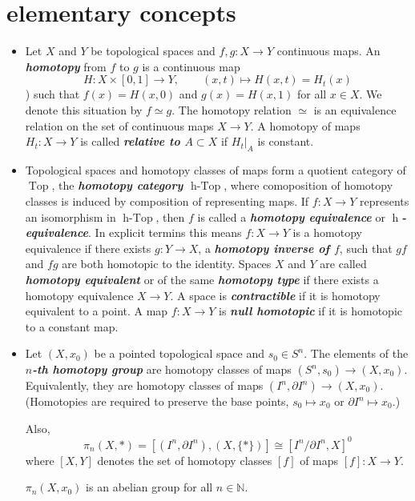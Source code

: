 \documentclass{article}
\newcommand{\N}{\mathbb{N}}
\DeclareMathOperator{\hTop}{h-Top}
\DeclareMathOperator{\Top}{Top}
\begin{document}
\section{elementary concepts}
\begin{defn}\leavevmode
	\begin{itemize}
		\item Let $X$ and $Y$ be topological spaces and $f,g:X\to Y$ continuous maps. An \textbf{\textit{homotopy}} from $f$ to $g$ is a continuous map
		\[H:X\times[0,1]\to Y,\qquad(x,t)\mapsto H(x,t)=H_t(x)\])
		such that $f(x)=H(x,0)$ and $g(x)=H(x,1)$ for all $x\in X$. We denote this situation by $f\simeq g$. The homotopy relation $\simeq$ is an equivalence relation on the set of continuous maps $X\to Y$. A homotopy of maps $H_t:X\to Y$ is called \textbf{\textit{relative to $A\subset X$}} if $H_t|_A$ is constant.
		
		\item Topological spaces and homotopy classes of maps form a quotient category of $\Top$, the \textbf{\textit{homotopy category $\hTop$}}, where comoposition of homotopy classes is induced by composition of representing maps. If $f:X\to Y$ represents an isomorphism in $\hTop$, then $f$ is called a \textbf{\textit{homotopy equivalence}} or \textbf{\textit{$\operatorname{h}$-equivalence}}. In explicit termins this means $f:X\to Y$ is a homotopy equivalence if there exists $g:Y\to X$, a \textbf{\textit{homotopy inverse of $f$}}, such that $gf$ and $fg$ are both homotopic to the identity. Spaces $X$ and $Y$ are called \textbf{\textit{homotopy equivalent}} or of the same \textbf{\textit{homotopy type}} if there exists a homotopy equivalence $X\to Y$. A space is \textbf{\textit{contractible}} if it is homotopy equivalent to a point. A map $f:X\to Y$ is \textbf{\textit{null homotopic}} if it is homotopic to a constant map.
		
		\item Let $(X,x_0)$ be a pointed topological space and $s_0\in S^n$. The elements of the \textbf{\textit{$n$-th homotopy group}} are homotopy classes of maps $(S^n,s_0)\to (X,x_0)$. Equivalently, they are homotopy classes of maps $(I^n,\partial I^n)\to (X,x_0)$. (Homotopies are required to preserve the base points, $s_0\mapsto x_0$ or $\partial I^n\mapsto x_0$.)
		
		Also,
		\[\pi_n(X,*)=[(I^n,\partial I^n),(X,\{*\})]\cong[I^n/\partial I^n,X]^0\]
		where $[X,Y]$ denotes the set of homotopy classes $[f]$ of maps $[f]:X\to Y$.
		\begin{prop}
			$\pi_n(X,x_0)$ is an abelian group for all $n\in\N$.
		\end{prop}
				

\end{itemize}
\end{defn}
\end{document}
